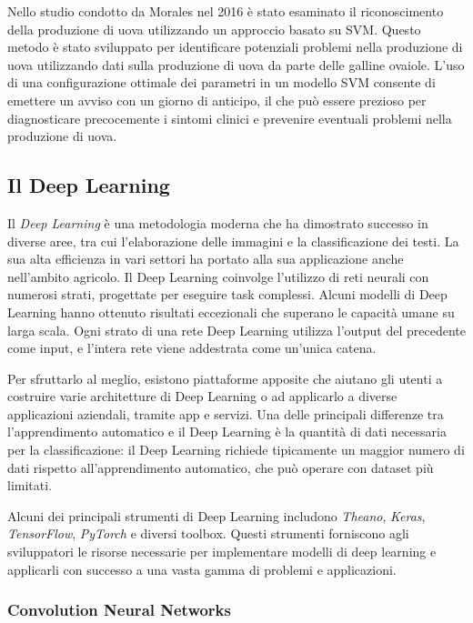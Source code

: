 Nello studio condotto da Morales nel 2016 è stato esaminato il riconoscimento della produzione di uova utilizzando un approccio basato su SVM. Questo metodo è stato sviluppato per identificare potenziali problemi nella produzione di uova utilizzando dati sulla produzione di uova da parte delle galline ovaiole. L'uso di una configurazione ottimale dei parametri in un modello SVM consente di emettere un avviso con un giorno di anticipo, il che può essere prezioso per diagnosticare precocemente i sintomi clinici e prevenire eventuali problemi nella produzione di uova.

\subsection{Il Deep Learning}

Il \textit{Deep Learning} è una metodologia moderna che ha dimostrato successo in diverse aree, tra cui l'elaborazione delle immagini e la classificazione dei testi. La sua alta efficienza in vari settori ha portato alla sua applicazione anche nell'ambito agricolo. Il Deep Learning coinvolge l'utilizzo di reti neurali con numerosi strati, progettate per eseguire task complessi. Alcuni modelli di Deep Learning hanno ottenuto risultati eccezionali che superano le capacità umane su larga scala. Ogni strato di una rete Deep Learning utilizza l'output del precedente come input, e l'intera rete viene addestrata come un'unica catena.

Per sfruttarlo al meglio, esistono piattaforme apposite che aiutano gli utenti a costruire varie architetture di Deep Learning o ad applicarlo a diverse applicazioni aziendali, tramite app e servizi. Una delle principali differenze tra l'apprendimento automatico e il Deep Learning è la quantità di dati necessaria per la classificazione: il Deep Learning richiede tipicamente un maggior numero di dati rispetto all'apprendimento automatico, che può operare con dataset più limitati.

Alcuni dei principali strumenti di Deep Learning includono \textit{Theano}, \textit{Keras}, \textit{TensorFlow}, \textit{PyTorch} e diversi toolbox. Questi strumenti forniscono agli sviluppatori le risorse necessarie per implementare modelli di deep learning e applicarli con successo a una vasta gamma di problemi e applicazioni.

\subsubsection{Convolution Neural Networks}

